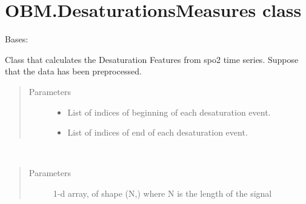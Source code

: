 \documentclass[letterpaper,10pt,english]{sphinxmanual}
\begin{document}
\section{OBM.DesaturationsMeasures class}
\label{\detokenize{OBM:module-OBM.DesaturationsMeasures}}\label{\detokenize{OBM:obm-desaturationsmeasures-class}}

\begin{fulllineitems}
\label{\detokenize{OBM:OBM.DesaturationsMeasures.DesaturationsMeasures}}
Bases: 

Class that calculates the Desaturation Features from spo2 time series.
Suppose that the data has been preprocessed.
\begin{quote}\begin{description}
\item[{Parameters}] \leavevmode\begin{itemize}
\item {} 
 \textendash{} List of indices of beginning of each desaturation event.

\item {} 
 \textendash{} List of indices of end of each desaturation event.

\end{itemize}

\end{description}\end{quote}

\begin{fulllineitems}
\label{\detokenize{OBM:OBM.DesaturationsMeasures.DesaturationsMeasures.compute}}~\begin{quote}\begin{description}
\item[{Parameters}] \leavevmode
{} \textendash{} 1-d array, of shape (N,) where N is the length of the signal


\end{description}
\end{quote}
\end{fulllineitems}
\end{fulllineitems}
\end{document}

